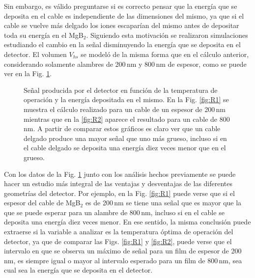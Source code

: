 Sin embargo, es válido preguntarse si es correcto pensar que la energía que se deposita en el cable es independiente de las dimensiones del mismo, ya que si el cable se vuelve más delgado los iones escaparían del mismo antes de depositar toda su energía en el MgB$_2$. Siguiendo esta motivación se realizaron simulaciones estudiando el cambio en la señal disminuyendo la energía que se deposita en el detector. El volumen $V_{hs}$ se modeló de la misma forma que en el cálculo anterior, considerando solamente alambres de 200\,nm y 800\,nm de espesor, como se puede ver en la Fig. \ref{fig:RvsrvsQ}. 

\begin{figure}[h!]
  \hspace{-1.4cm}
   \caption[Señal producida por el detector en función de la temperatura de operación y la energía depositada en el mismo.]{Señal producida por el detector en función de la temperatura de operación y la energía depositada en el mismo. En la Fig. \ref{fig:R1} se muestra el cálculo realizado para un cable de un espesor de 200\,nm mientras que en la \ref{fig:R2} aparece el resultado para un cable de 800\,nm. A partir de comparar estos gráficos es claro ver que un cable delgado produce una mayor señal que uno más grueso, incluso si en el cable delgado se deposita una energía diez veces menor que en el grueso.}
\label{fig:RvsrvsQ}
\end{figure}

Con los datos de la Fig. \ref{fig:RvsrvsQ} junto con los análisis hechos previamente se puede hacer un estudio más integral de las ventajas y desventajas de las diferentes geometrías del detector. Por ejemplo, en la Fig. \ref{fig:R1} puede verse que si el espesor del cable de MgB$_{2}$ es de 200\,nm se tiene una señal que es mayor que la que se puede esperar para un alambre de 800\,nm, incluso si en el cable se deposita una energía diez veces menor. En ese sentido, la misma conclusión puede extraerse si la variable a analizar es la temperatura óptima de operación del detector, ya que de comparar las Figs. \ref{fig:R1} y \ref{fig:R2}, puede verse que el intervalo en que se observa un máximo de señal para un film de espesor de 200\,nm, es siempre igual o mayor al intervalo esperado para un film de 800\,nm, sea cual sea la energía que se deposita en el detector.

